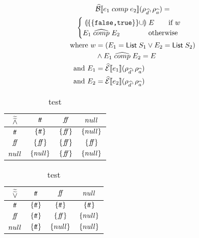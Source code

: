 \begin{multline}
    \widehat{\mathcal{B}}\llbracket e_1 \;comp\; e_2 \rrbracket(\rho_{\widehat{d}}, \rho_{\widehat{a}}) = \\
    \begin{cases}
        \;\llparenthesis\{\{\texttt{false,true}\}\} \cup\rrparenthesis\; E \quad \quad \text{if } w \\
        E_1 \;\widehat{comp}\; E_2 \quad \quad \quad \quad \text{otherwise}
    \end{cases} \\
    \begin{split}
        \text{where } w&=(E_1 = \mathsf{List} \; S_1 \lor E_2 = \mathsf{List} \; S_2) \\
        &\land E_1 \;\widehat{comp}\; E_2 = E \\
        \text{and } E_1 &= \widehat{\mathcal{E}}\llbracket e_1 \rrbracket(\rho_{\widehat{d}}, \rho_{\widehat{a}})  \\
        \text{and }  E_2 &= \widehat{\mathcal{E}}\llbracket e_2 \rrbracket(\rho_{\widehat{d}}, \rho_{\widehat{a}})
    \end{split}
\end{multline}


\begin{table}[H]
    \centering
    \caption{test}
    \begin{tabular}{c|ccc}
        $\widetilde{\widetilde{\land}}$ & $t\!t$ & $f\!\!f$ & $null$ \\
        \hline
        $t\!t$ & $\{t\!t\}$ & $\{f\!\!f\}$ & $\{null\}$ \\
        $f\!\!f$ & $\{f\!\!f\}$ & $\{f\!\!f\}$ & $\{f\!\!f\}$ \\
        $null$ & $\{null\}$ & $\{f\!\!f\}$ & $\{null\}$ \\
    \end{tabular}
    \label{tab:aaabland}
\end{table}

\begin{table}[H]
    \centering
    \caption{test}
    \begin{tabular}{c|ccc}
        $\widetilde{\widetilde{\lor}}$ & $t\!t$ & $f\!\!f$ & $null$ \\
        \hline
        $t\!t$ & $\{t\!t\}$ & $\{t\!t\}$ & $\{t\!t\}$ \\
        $f\!\!f$ & $\{t\!t\}$ & $\{f\!\!f\}$ & $\{null\}$ \\
        $null$ & $\{t\!t\}$ & $\{null\}$ & $\{null\}$ \\
    \end{tabular}
    \label{tab:aaablor}
\end{table}

